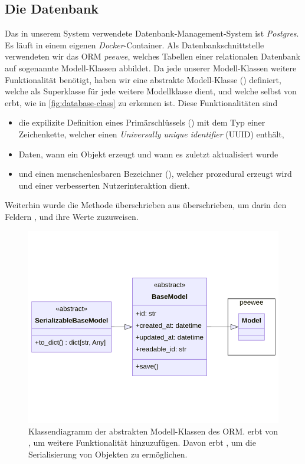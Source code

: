 \subsection{Die Datenbank}

Das in unserem System verwendete Datenbank-Management-System ist \emph{Postgres}. Es läuft in einem eigenen \emph{Docker}-Container. Als Datenbankschnittstelle verwendeten wir das ORM \emph{peewee}, welches Tabellen einer relationalen Datenbank auf sogenannte Modell-Klassen abbildet. Da jede unserer Modell-Klassen weitere Funktionalität benötigt, haben wir eine abstrakte Modell-Klasse () definiert, welche als Superklasse für jede weitere Modellklasse dient, und welche selbst von  erbt, wie in \autoref{fig:database-class} zu erkennen ist. Diese Funktionalitäten sind
\begin{itemize}
	\item die expilizite Definition eines Primärschlüssels () mit dem Typ einer Zeichenkette, welcher einen \emph{Universally unique identifier} (UUID) enthält,
	\item Daten, wann ein Objekt erzeugt und wann es zuletzt aktualisiert wurde
	\item und einen menschenlesbaren Bezeichner (), welcher prozedural erzeugt wird und einer verbesserten Nutzerinteraktion dient.
\end{itemize}
Weiterhin wurde die Methode  überschrieben aus  überschrieben, um darin den Feldern ,  und  ihre Werte zuzuweisen.

\begin{figure}[!ht]
	\centering
	\includegraphics[width=0.75\linewidth]{images/diagrams/database-class.png}
	\caption{Klassendiagramm der abstrakten Modell-Klassen des ORM.  erbt von , um weitere Funktionalität hinzuzufügen. Davon erbt , um die Serialisierung von Objekten zu ermöglichen.}
	\label{fig:database-class}
\end{figure}

